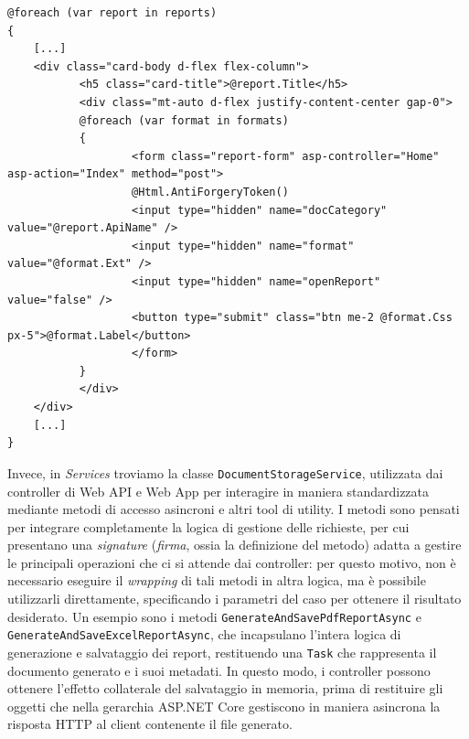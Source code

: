 \begin{itemize}
        \begin{lstlisting}[language={[Sharp]C}, caption={[Estratto della view dell'homepage] Estratto della \emph{view} principale dell'interfaccia web, a dimostrazione della potenza di Razor nell'integrazione di logica e markup per il rendering dinamico.}, label=lst:indexcshtml]
@foreach (var report in reports)
{
    [...]
    <div class="card-body d-flex flex-column">
           <h5 class="card-title">@report.Title</h5>
           <div class="mt-auto d-flex justify-content-center gap-0">
           @foreach (var format in formats)
           {
                   <form class="report-form" asp-controller="Home" asp-action="Index" method="post">
                   @Html.AntiForgeryToken()
                   <input type="hidden" name="docCategory" value="@report.ApiName" />
                   <input type="hidden" name="format" value="@format.Ext" />
                   <input type="hidden" name="openReport" value="false" />
                   <button type="submit" class="btn me-2 @format.Css px-5">@format.Label</button>
                   </form>
           }
           </div>
    </div>
    [...]
}
\end{lstlisting}
\end{itemize}

Invece, in \emph{Services} troviamo la classe \texttt{DocumentStorageService}, utilizzata dai controller di Web API e Web App per interagire in maniera standardizzata mediante metodi di accesso asincroni e altri tool di utility. I metodi sono pensati per integrare completamente la logica di gestione delle richieste, per cui presentano una \emph{signature} (\emph{firma}, ossia la definizione del metodo) adatta a gestire le principali operazioni che ci si attende dai controller: per questo motivo, non è necessario eseguire il \emph{wrapping} di tali metodi in altra logica, ma è possibile utilizzarli direttamente, specificando i parametri del caso per ottenere il risultato desiderato.
Un esempio sono i metodi \texttt{GenerateAndSavePdfReportAsync} e \texttt{GenerateAndSaveExcelReportAsync}, che incapsulano l'intera logica di generazione e salvataggio dei report, restituendo una \texttt{Task} che rappresenta il documento generato e i suoi metadati. In questo modo, i controller possono ottenere l'effetto collaterale del salvataggio in memoria, prima di restituire gli oggetti che nella gerarchia ASP.NET Core gestiscono in maniera asincrona la risposta HTTP al client contenente il file generato.


